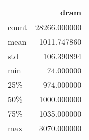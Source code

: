 \begin{tabular}{lr}
\toprule
{} &          dram \\
\midrule
count &  28266.000000 \\
mean  &   1011.747860 \\
std   &    106.390894 \\
min   &     74.000000 \\
25\%   &    974.000000 \\
50\%   &   1000.000000 \\
75\%   &   1035.000000 \\
max   &   3070.000000 \\
\bottomrule
\end{tabular}
